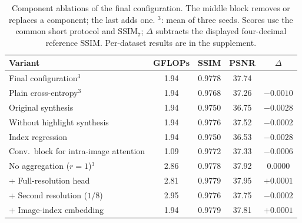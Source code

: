 \begin{table}[htb]
\centering
\small
\setlength{\tabcolsep}{2pt}
\caption{Component ablations of the final configuration. The middle block removes or replaces a component; the last adds one. $^3$: mean of three seeds. Scores use the common short protocol and SSIM$_7$; $\Delta$ subtracts the displayed four-decimal reference SSIM. Per-dataset results are in the supplement.}
\label{tab:ablation}
\begin{tabular}{lcccc}
\toprule
Variant & GFLOPs & SSIM & PSNR & $\Delta$ \\
\midrule
Final configuration$^{3}$ & 1.94 & 0.9778 & 37.74 &  \\
\midrule
Plain cross-entropy$^{3}$ & 1.94 & 0.9768 & 37.26 & $-0.0010$ \\
Original synthesis & 1.94 & 0.9750 & 36.75 & $-0.0028$ \\
Without highlight synthesis & 1.94 & 0.9776 & 37.52 & $-0.0002$ \\
Index regression & 1.94 & 0.9750 & 36.53 & $-0.0028$ \\
Conv.\ block for intra-image attention & 1.09 & 0.9772 & 37.33 & $-0.0006$ \\
No aggregation ($r=1$)$^{3}$ & 2.86 & 0.9778 & 37.92 & 0.0000 \\
\midrule
+ Full-resolution head & 2.81 & 0.9779 & 37.95 & $+0.0001$ \\
+ Second resolution ($1/8$) & 2.95 & 0.9776 & 37.75 & $-0.0002$ \\
+ Image-index embedding & 1.94 & 0.9779 & 37.81 & $+0.0001$ \\
\bottomrule
\end{tabular}
\end{table}
